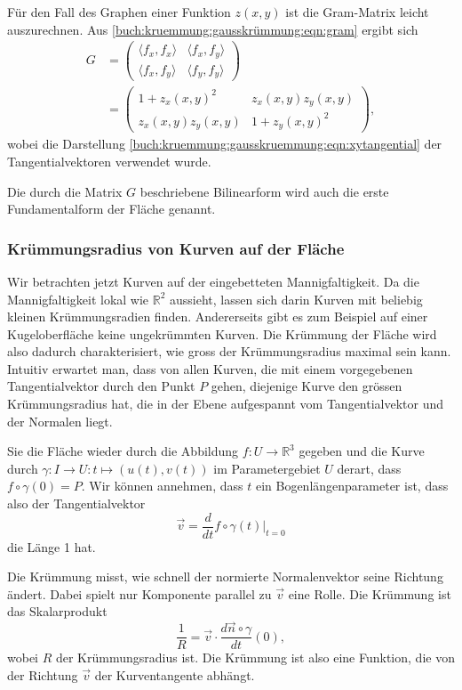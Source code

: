 \begin{beispiel}
Für den Fall des Graphen einer Funktion $z(x,y)$ ist die Gram-Matrix
leicht auszurechnen.
Aus \eqref{buch:kruemmung:gausskrümmung:eqn:gram} ergibt sich
\begin{align*}
G
&=
\begin{pmatrix}
\langle f_x,f_x\rangle & \langle f_x,f_y\rangle \\
\langle f_x,f_y\rangle & \langle f_y,f_y\rangle
\end{pmatrix}
\\
&=
\begin{pmatrix}
1+z_x(x,y)^2 & z_x(x,y)z_y(x,y) \\
z_x(x,y) z_y(x,y) & 1 + z_y(x,y)^2
\end{pmatrix},
\end{align*}
wobei die Darstellung
\eqref{buch:kruemmung:gausskruemmung:eqn:xytangential}
der Tangentialvektoren verwendet wurde.
\end{beispiel}

Die durch die Matrix $G$ beschriebene Bilinearform wird auch die
erste Fundamentalform der Fläche genannt.

%
%
\subsubsection{Krümmungsradius von Kurven auf der Fläche}
Wir betrachten jetzt Kurven auf der eingebetteten Mannigfaltigkeit.
Da die Mannigfaltigkeit lokal wie $\mathbb{R}^2$ aussieht, lassen sich
darin Kurven mit beliebig kleinen Krümmungsradien finden.
Andererseits gibt es zum Beispiel auf einer Kugeloberfläche keine 
ungekrümmten Kurven.
Die Krümmung der Fläche wird also dadurch charakterisiert,
wie gross der Krümmungsradius maximal sein kann.
Intuitiv erwartet man, dass von allen Kurven, die mit einem vorgegebenen
Tangentialvektor durch den Punkt $P$ gehen, diejenige Kurve den grössen
Krümmungsradius hat, die in der Ebene aufgespannt vom Tangentialvektor
und der Normalen liegt.

Sie die Fläche wieder durch die Abbildung $f\colon U\to\mathbb{R}^3$
gegeben und die Kurve durch 
$\gamma\colon I\to U : t\mapsto(u(t),v(t))$ im
Parametergebiet $U$ derart, dass $f\circ\gamma(0)=P$.
Wir können annehmen, dass $t$ ein Bogenlängenparameter ist, dass
also der Tangentialvektor 
\[
\vec{v}
=
\frac{d}{dt} f\circ\gamma(t) 
\bigg|_{t=0}
\]
die Länge 1 hat.

Die Krümmung misst, wie schnell der normierte Normalenvektor seine
Richtung ändert.
Dabei spielt nur Komponente parallel zu $\vec{v}$ eine Rolle.
Die Krümmung ist das Skalarprodukt
\[
\frac{1}{R}
=
\vec{v} \cdot \frac{d\vec{n}\circ\gamma}{dt}(0),
\]
wobei $R$ der Krümmungsradius ist.
Die Krümmung ist also eine Funktion, die von der Richtung $\vec{v}$
der Kurventangente abhängt.

